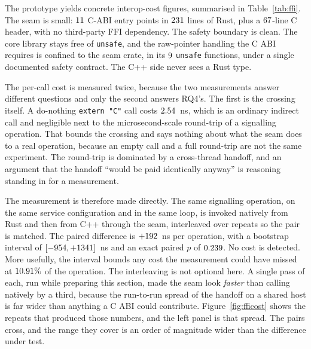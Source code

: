 \documentclass[english,oneside,a4paper,censored,csm,software-track-2020]{HYthesisML}
\begin{document}
The prototype yields concrete interop-cost figures, summarised in Table~\ref{tab:ffi}. The
seam is small: $11$ C-ABI entry points in $231$ lines of Rust, plus a
$67$-line C
header, with no third-party FFI dependency. The safety boundary is clean. The core library
stays free of \texttt{unsafe}, and the raw-pointer handling the C ABI requires is confined
to the seam crate, in its $9$ \texttt{unsafe} functions, under a single documented
safety contract. The C++ side never sees a Rust type.

The per-call cost is measured twice, because the two measurements answer different questions
and only the second answers RQ4's. The first is the crossing itself. A do-nothing
\texttt{extern "C"} call costs $2.54$~ns, which is an ordinary indirect call and
negligible next to the microsecond-scale round-trip of a signalling operation. That bounds the
crossing and says nothing about what the seam does to a real operation, because an empty call
and a full round-trip are not the same experiment. The round-trip is dominated by a
cross-thread handoff, and an argument that the handoff ``would be paid identically anyway'' is
reasoning standing in for a measurement.

The measurement is therefore made directly. The same signalling operation, on the same service
configuration and in the same loop, is invoked natively from Rust and then from C++ through the
seam, interleaved over \FfiOpRepeats{} repeats so the pair is matched. The paired difference is
$+192$~ns per operation, with a bootstrap interval of $[-954, +1341]$~ns
and an exact paired $p$ of $0.239$. No cost is detected. More usefully, the interval
bounds any cost the measurement could have missed at $10.91\%$ of the operation. The
interleaving is not optional here. A single pass of each, run while preparing this section,
made the seam look \emph{faster} than calling natively by a third, because the run-to-run
spread of the handoff on a shared host is far wider than anything a C ABI could contribute.
Figure~\ref{fig:fficost} shows the repeats that produced those numbers, and the left panel is
that spread. The pairs cross, and the range they cover is an order of magnitude wider than the
difference under test.
\end{document}
